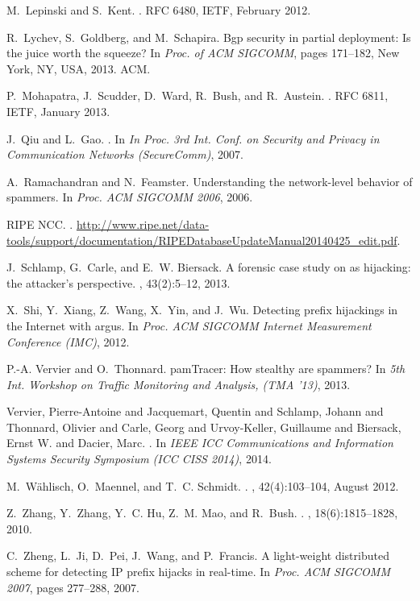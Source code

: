 \documentclass{llncs}
\begin{document}
\begin{thebibliography}{10}
M.~Lepinski and S.~Kent.
.
\newblock RFC 6480, IETF, February 2012.

R.~Lychev, S.~Goldberg, and M.~Schapira.
\newblock Bgp security in partial deployment: Is the juice worth the squeeze?
\newblock In {\em Proc. of ACM SIGCOMM}, pages 171--182, New York, NY, USA,
  2013. ACM.

P.~Mohapatra, J.~Scudder, D.~Ward, R.~Bush, and R.~Austein.
.
\newblock RFC 6811, IETF, January 2013.

J.~Qiu and L.~Gao.
.
\newblock In {\em In Proc. 3rd Int. Conf. on Security and Privacy in
  Communication Networks (SecureComm)}, 2007.

A.~Ramachandran and N.~Feamster.
\newblock Understanding the network-level behavior of spammers.
\newblock In {\em Proc. ACM SIGCOMM 2006}, 2006.

{RIPE NCC}.
.
\newblock
  \url{http://www.ripe.net/data-tools/support/documentation/RIPEDatabaseUpdateManual20140425_edit.pdf}.

J.~Schlamp, G.~Carle, and E.~W. Biersack.
\newblock A forensic case study on {as} hijacking: the attacker's perspective.
, 43(2):5--12, 2013.

X.~Shi, Y.~Xiang, Z.~Wang, X.~Yin, and J.~Wu.
\newblock Detecting prefix hijackings in the {I}nternet with argus.
\newblock In {\em Proc. ACM SIGCOMM Internet Measurement Conference (IMC)},
  2012.

P.-A. {V}ervier and O.~{T}honnard.
pam{T}racer: {H}ow stealthy are spammers?
\newblock In {\em 5th {I}nt. {W}orkshop on {T}raffic {M}onitoring and
  {A}nalysis, (TMA '13)}, 2013.

{Vervier, Pierre-Antoine and Jacquemart, Quentin and Schlamp, Johann and
  Thonnard, Olivier and Carle, Georg and Urvoy-Keller, Guillaume and Biersack,
  Ernst W. and Dacier, Marc}.
.
\newblock In {\em IEEE ICC Communications and Information Systems Security
  Symposium (ICC CISS 2014)}, 2014.

M.~W\"{a}hlisch, O.~Maennel, and T.~C. Schmidt.
.
, 42(4):103--104, August 2012.

Z.~Zhang, Y.~Zhang, Y.~C. Hu, Z.~M. Mao, and R.~Bush.
.
, 18(6):1815--1828, 2010.

C.~Zheng, L.~Ji, D.~Pei, J.~Wang, and P.~Francis.
\newblock A light-weight distributed scheme for detecting {IP} prefix hijacks
  in real-time.
\newblock In {\em Proc. ACM SIGCOMM 2007}, pages 277--288, 2007.

\end{thebibliography}
\end{document}
